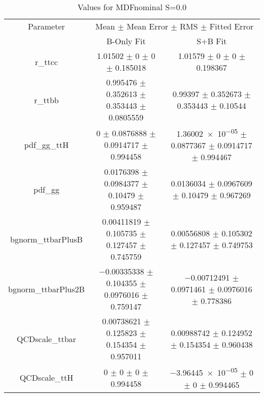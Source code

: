 \begin{table}
\centering
\caption{Values for MDFnominal S=0.0}
\begin{tabular}{ccc}
\toprule
Parameter & \multicolumn{2}{c}{Mean $\pm$ Mean Error $\pm$ RMS $\pm$ Fitted Error}\\
 & B-Only Fit & S+B Fit\\
\midrule
r\_ttcc & \num{1.01502} $\pm$ \num{0} $\pm$ \num{0} $\pm$ \num{0.185018} & \num{1.01579} $\pm$ \num{0} $\pm$ \num{0} $\pm$ \num{0.198367}\\
r\_ttbb & \num{0.995476} $\pm$ \num{0.352613} $\pm$ \num{0.353443} $\pm$ \num{0.0805559} & \num{0.99397} $\pm$ \num{0.352673} $\pm$ \num{0.353443} $\pm$ \num{0.10544}\\
pdf\_gg\_ttH & \num{0} $\pm$ \num{0.0876888} $\pm$ \num{0.0914717} $\pm$ \num{0.994458} & \num{1.36002e-05} $\pm$ \num{0.0877367} $\pm$ \num{0.0914717} $\pm$ \num{0.994467}\\
pdf\_gg & \num{0.0176398} $\pm$ \num{0.0984377} $\pm$ \num{0.10479} $\pm$ \num{0.959487} & \num{0.0136034} $\pm$ \num{0.0967609} $\pm$ \num{0.10479} $\pm$ \num{0.967269}\\
bgnorm\_ttbarPlusB & \num{0.00411819} $\pm$ \num{0.105735} $\pm$ \num{0.127457} $\pm$ \num{0.745759} & \num{0.00556808} $\pm$ \num{0.105302} $\pm$ \num{0.127457} $\pm$ \num{0.749753}\\
bgnorm\_ttbarPlus2B & \num{-0.00335338} $\pm$ \num{0.104355} $\pm$ \num{0.0976016} $\pm$ \num{0.759147} & \num{-0.00712491} $\pm$ \num{0.0971461} $\pm$ \num{0.0976016} $\pm$ \num{0.778386}\\
QCDscale\_ttbar & \num{0.00738621} $\pm$ \num{0.125823} $\pm$ \num{0.154354} $\pm$ \num{0.957011} & \num{0.00988742} $\pm$ \num{0.124952} $\pm$ \num{0.154354} $\pm$ \num{0.960438}\\
QCDscale\_ttH & \num{0} $\pm$ \num{0} $\pm$ \num{0} $\pm$ \num{0.994458} & \num{-3.96445e-05} $\pm$ \num{0} $\pm$ \num{0} $\pm$ \num{0.994465}\\
\bottomrule
\end{tabular}
\end{table}